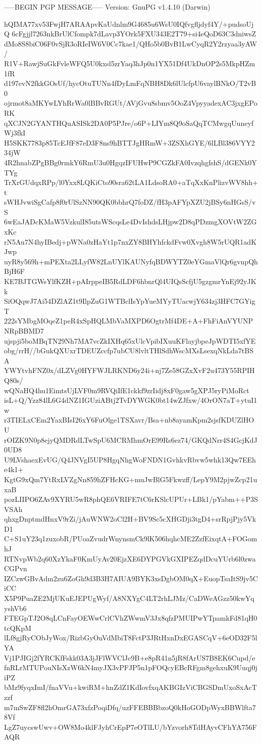 -----BEGIN PGP MESSAGE-----
Version: GnuPG v1.4.10 (Darwin)

hQIMA77xv53FwjH7ARAApvKaUdnlm9G4685u6WsU0IQfvgfljdyf4Y/+pudsoUjQ
6cFgjjl7263nkBrUlCfompk7dLavp3YOrk5FXU343E2T79+si4eQoD63C3dniwsZ
dMo8S8biC06F0vSjR3oRIeIW6V0Cc7kae1/QHo5b0BvB1LwCyqR2Y2rzyaa3yAW/
R1V+RawjSuGkFvleWFQ5U0kxsl5zrYaq3hJp0n1YX51Df4UkDnOP2s5MkpHZm1fR
d197evN2fkkGOsUf/hycOtuTUNn4fDyLmFqNBH8Dk6lUlcfpU6vaylBNkO/T2vB0
ojrmot8aMKYwLYhRrWa0lBBvRGUt/AVjGvu8sbmv5OoZ4VpyyadexAC3jxgEPoRK
qXCJN2GYANTHQuASISk2DA0P5PJre/o6P+LIYm8Q9oSaQqTCMwgqUuneyfWj3fkI
H5SKK7783p85TcEJfF87eD3F8ns9hBTTJgHRmW+3ZSXhGYE/6lLBl386VYY234jW
4R2hnabZPgBBg0rmkY6RmU3u0HgqzIFUHwP9CGZkFA0IvzqhgfshS/dGENk0YTYg
TrXrGUdqxRPp/l0Yxx8LQKiCto90sra62tLA1LdsoRA0+aTqXxKnPlizvWV8hh+t
sWHJvwiSgCafp8f0rUlSzNN90QK0bbhrQ7foDZ/fH3pAFYpXZU2jBSy6nHGsS/vS
6wEaJADcKMaW5VzkulI85utsWScqsLe4DvIshdsLHjpw2D8qPDzmgXOVtW2ZGxKc
rN5Au7N4hyIBedj+pWNa0zHaYt1p7nxZY8BHYhfckdFvw0Xvgh8W5rUQR1adKJwp
uyR8y569h+mPEXta2LLyfW82LnUYlKAUNyfqBDWYTZ0eYGmaVlQr6gvnpQhBjH6F
KE7BJTGWsYlfKZH+pAIrppeIB5RdLDF6hbnrQl4UIQsScfjU5gzgmrYnEj92yJKk
SiOQqwJ7Ai54DZlAZ1t9IlpZuG1WTBclIsYpYueMYyTUacwjY634zj3HFC7GYigT
222sYMbgMOqeZ1peR4xSpHQLMbVaMXPD6OgtrMf4DE+A+FhFiAnVYUNPNRpBBMD7
ujspji5boMBqTN29Nh7MA7vcZkIXHq65xUlcVpibIXuuKFlayjbpeJpWDTI5xfYE
obg/rrH//bGukQXUxrTDEUZccfp7ubCU8lvltTHlSdhWscMXsLsexqNkLda7tBSA
YWYtvhFNZ0x/dLZVg0HYFWJLRKND6y24i+nj7Ze58GZxXvF2u473Y55RPIHQ80s/
wQNaHQ4hu1EimtsUjLVF0m9RVQiIfE1ckkf9zrIidj8xF0gaw5gXPJ5ryPiMoRct
isL+Q/Yzz84lL6G4dNZ1IGUziABtj2TvDYWGK0bt14wZJfxw/4OrON7aT+ytuI1w
r3TIELxCEm2YaxBIsI26xY6FuOlge1TSXavr/Bsa+nb8ayamKpm2sjsfKDUZlHOU
rOIZK9N0p8ejyQMDRdLTwSpU6MCRMhmOrE99Rs6ez74/GKQdNrr4S4GcjKdJ0UD8
U9LVshaexEvUG/Q4JNVgI5UP8HgqNhgWoFNDN1GvhkvRbvw5whk13Qw7EEhe4k1+
KgtG9xQm7YtRxLVZgNn859hZFHcKG+muJwBlG5Fkwzff/LepY9M2pjwZcp21uxaB
pozLIIPO6ZAv9XYRU5wR8phQE6VRIFE7tC6rKSlcUPUr+LBk1/pYabm++P3SVSAh
qhxgDnptmdHnxV9rZi/jAuWNW2oCl2H+BV9Sc5cXHGDji3tgD4+srRpjPjy5VkD1
C+S1uY23q1zuxobR/PUoaZvudrWnynsmCk9lK506hqhcME2ZzfEixqtA+FOGomhJ
RTNvpWb2q60XzYkaF0KmUyAv20EjzXE6DYPGVkGXIPEZqdDcuYUrb6l0zwaCGPvn
IZCzwGBvAdm2zu6ZoGh9d3B3H7AIUA9BYK3xsDgbOM0qX+EuopTsaItS9jv5CiCC
X5P9PuaZE2MjUKuEJEPUgWyf/A8NXYgC4LT2rhLJMz/CaDWeAGzz50kwYqyshVb6
FTEGpTJ2O8qLCnFayOEWwCrlCVhZWwmV3Jx8qfzPMUIPwYTpamkFd81qH0tcQKpM
lLf8gjRyCObJyWox/RizbGyOnVdMbiT8FctP3JRtHxnDxEGASCqV+6eOD32F5lYA
Vj1PJIGj2fYRCKfFskk03A3jJFlWVClJc9B+e8pR41n5jR8fArUS7B8EK6Cupd/e
fnRLrMTUPouNIsXzW6kN4myJX3vPFJP5n1pFOQcyEBcRFgm8gehxuK9Uuqj0jiPZ
bMz9fyqxImI/fnaVVu+kwiRM+hnZdZ1KdIovfxqAKBGIzViCBGSDmUxoSxAcTzzf
m7mSwZF8fl2hOmrGA73xfzPoqiDfq/uzFFEBBBbzoQ0kHoGODpWyxBBWlfta78Vf
LgZ7uycswUwv+OW8Mo4klFJyhCrEpP7eOTlLU/bYzvorh8TdHAyvCFhYA756FAQR
